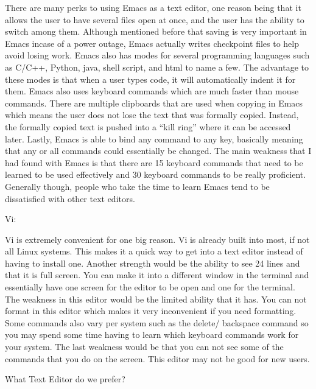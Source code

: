 \documentclass{article} %
\begin{document}
\noindent There are many perks to using Emacs as a text editor, one reason being that it allows the user to have several files open at once, and the user has the ability to switch among them. Although mentioned before that saving is very important in Emacs incase of a power outage, Emacs actually writes checkpoint files to help avoid losing work. Emacs also has modes for several programming languages such as C/C++, Python, java, shell script, and html to name a few. The advantage to these modes is that when a user types code, it will automatically indent it for them. Emacs also uses keyboard commands which are much faster than mouse commands. There are multiple clipboards that are used when copying in Emacs which means the user does not lose the text that was formally copied. Instead, the formally copied text is pushed into a ``kill ring'' where it can be accessed later. Lastly, Emacs is able to bind any command to any key, basically meaning that any or all commands could essentially be changed. The main weakness that I had found with Emacs is that there are 15 keyboard commands that need to be learned to be used effectively and 30 keyboard commands to be really proficient. Generally though, people who take the time to learn Emacs tend to be dissatisfied with other text editors.

\noindent 

\noindent Vi:

\noindent 

\noindent Vi is extremely convenient for one big reason. Vi is already built into most, if not all Linux systems. This makes it a quick way to get into a text editor instead of having to install one. Another strength would be the ability to see 24 lines and that it is full screen. You can make it into a different window in the terminal and essentially have one screen for the editor to be open and one for the terminal. The weakness in this editor would be the limited ability that it has. You can not format in this editor which makes it very inconvenient if you need formatting. Some commands also  vary per system such as the delete/ backspace command so you may spend some time having to learn which keyboard commands work for your system. The last weakness would be that you can not see some of the commands that you do on the screen. This editor may not be good for new users. 

\noindent 

\noindent What Text Editor do we prefer?

\noindent 
\end{document}
